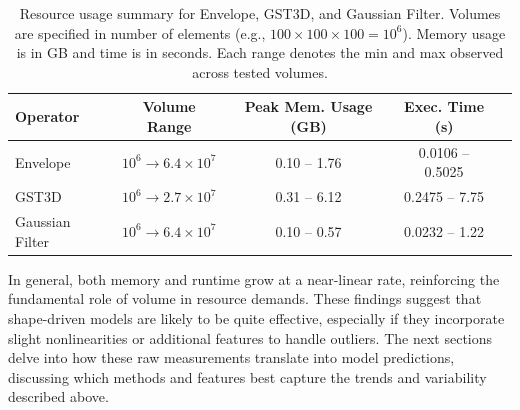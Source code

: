 \begin{table}[htbp]
    \centering
    \begin{tabular}{lcccc}
        \hline
        \textbf{Operator} & \textbf{Volume Range} & \textbf{Peak Mem. Usage (GB)} & \textbf{Exec. Time (s)} \\ \hline
        Envelope &
        $10^6 \!\to\! 6.4\times10^7$ &
        0.10 -- 1.76 &
        0.0106 -- 0.5025 \\
        \ac{GST3D} &
        $10^6 \!\to\! 2.7\times10^7$ &
        0.31 -- 6.12 &
        0.2475 -- 7.75 \\
        Gaussian Filter &
        $10^6 \!\to\! 6.4\times10^7$ &
        0.10 -- 0.57 &
        0.0232 -- 1.22 \\
        \hline
    \end{tabular}
    \caption{Resource usage summary for Envelope, \ac{GST3D}, and Gaussian Filter.
    Volumes are specified in number of elements (e.g., $100 \times 100 \times 100 = 10^6$).
    Memory usage is in GB and time is in seconds.
    Each range denotes the min and max observed across tested volumes.}
    \label{tab:operator_summary_aggregates}
\end{table}

In general, both memory and runtime grow at a near-linear rate, reinforcing the fundamental role of volume in resource demands.
These findings suggest that shape-driven models are likely to be quite effective, especially if they incorporate slight nonlinearities or additional features to handle outliers.
The next sections delve into how these raw measurements translate into model predictions, discussing which methods and features best capture the trends and variability described above.
